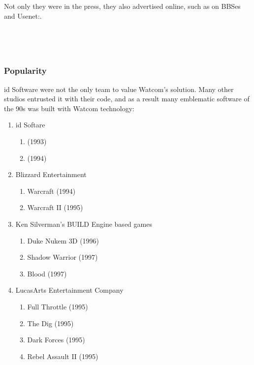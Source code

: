 \vspace{-4mm}
Not only they were in the press, they also advertised online, such as on BBSes and Usenet:.\\
\par
{}\\
\par
{}\\


\subsubsection{Popularity}
id Software were not the only team to value Watcom's solution. Many other studios entrusted it with their code, and as a result many emblematic software of the 90s was built with Watcom technology:\\
\begin{enumerate}
\item id Softare 
       \begin{enumerate}
       \item \doom{} (1993)
       \item \doomii{} (1994)
       \end{enumerate} 
\item Blizzard Entertainment 
       \begin{enumerate}
       \item Warcraft (1994)
       \item Warcraft II (1995)
       \end{enumerate}
\item Ken Silverman's BUILD Engine based games
      \begin{enumerate}
       \item Duke Nukem 3D (1996)
       \item Shadow Warrior (1997)
       \item Blood (1997)
       \end{enumerate}
\item LucasArts Entertainment Company
      \begin{enumerate}
       \item Full Throttle (1995)
       \item The Dig (1995)
       \item Dark Forces  (1995)
       \item Rebel Assault II  (1995)    
      \end{enumerate}
\end{enumerate}
\par


